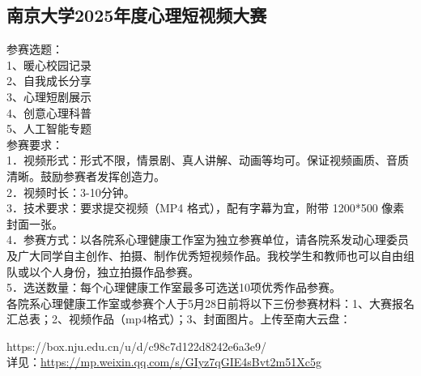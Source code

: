 \documentclass[letterpaper, 12pt]{article}
\begin{document}
\begin{multicols}{2}
\section{南京大学2025年度心理短视频大赛} %
参赛选题：
\\1、暖心校园记录
\\2、自我成长分享
\\3、心理短剧展示
\\4、创意心理科普
\\5、人工智能专题
\\参赛要求：
\\1．视频形式：形式不限，情景剧、真人讲解、动画等均可。保证视频画质、音质清晰。鼓励参赛者发挥创造力。
\\2．视频时长：3-10分钟。
\\3．技术要求：要求提交视频（MP4 格式），配有字幕为宜，附带 1200*500 像素封面一张。
\\4．参赛方式：以各院系心理健康工作室为独立参赛单位，请各院系发动心理委员及广大同学自主创作、拍摄、制作优秀短视频作品。我校学生和教师也可以自由组队或以个人身份，独立拍摄作品参赛。
\\5．选送数量：每个心理健康工作室最多可选送10项优秀作品参赛。\\
各院系心理健康工作室或参赛个人于5月28日前将以下三份参赛材料：1、大赛报名汇总表；2、视频作品（mp4格式）；3、封面图片。上传至南大云盘：

https://box.nju.edu.cn/u/d/c98c7d122d8242e6a3e9/
\\详见：\url{https://mp.weixin.qq.com/s/GIyz7qGIE4sBvt2m51Xc5g}


\end{multicols}
\end{document}
